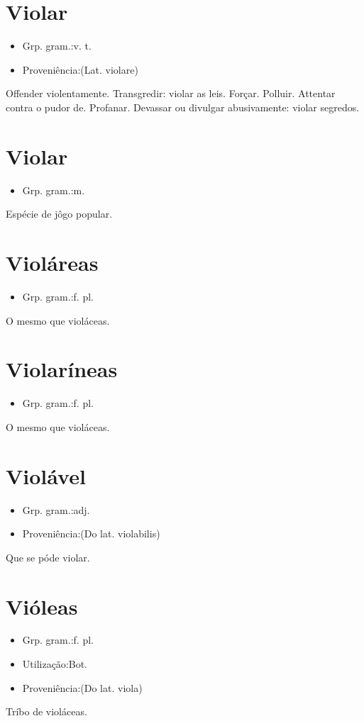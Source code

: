 \documentclass{article}
\begin{document}
\section{Violar}
\begin{itemize}
\item {Grp. gram.:v. t.}
\end{itemize}
\begin{itemize}
\item {Proveniência:(Lat. \textunderscore violare\textunderscore )}
\end{itemize}
Offender violentamente.
Transgredir: \textunderscore violar as leis\textunderscore .
Forçar.
Polluir.
Attentar contra o pudor de.
Profanar.
Devassar ou divulgar abusivamente: \textunderscore violar segredos\textunderscore .
\section{Violar}
\begin{itemize}
\item {Grp. gram.:m.}
\end{itemize}
Espécie de jôgo popular.
\section{Violáreas}
\begin{itemize}
\item {Grp. gram.:f. pl.}
\end{itemize}
O mesmo que \textunderscore violáceas\textunderscore .
\section{Violaríneas}
\begin{itemize}
\item {Grp. gram.:f. pl.}
\end{itemize}
O mesmo que \textunderscore violáceas\textunderscore .
\section{Violável}
\begin{itemize}
\item {Grp. gram.:adj.}
\end{itemize}
\begin{itemize}
\item {Proveniência:(Do lat. \textunderscore violabilis\textunderscore )}
\end{itemize}
Que se póde violar.
\section{Vióleas}
\begin{itemize}
\item {Grp. gram.:f. pl.}
\end{itemize}
\begin{itemize}
\item {Utilização:Bot.}
\end{itemize}
\begin{itemize}
\item {Proveniência:(Do lat. \textunderscore viola\textunderscore )}
\end{itemize}
Tríbo de violáceas.
\end{document}

